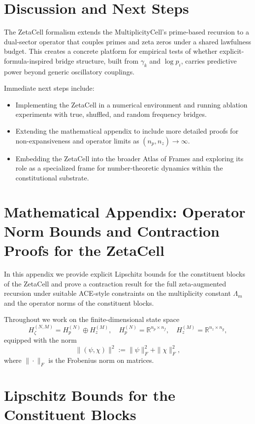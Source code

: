 \documentclass[11pt]{article}
\theoremstyle{definition}
\theoremstyle{plain}
\begin{document}
\section{Discussion and Next Steps}

The ZetaCell formalism extends the MultiplicityCell’s prime-based recursion to a dual-sector operator that couples primes and zeta zeros under a shared lawfulness budget.
This creates a concrete platform for empirical tests of whether explicit-formula-inspired bridge structure, built from $\gamma_k$ and $\log p_i$, carries predictive power beyond generic oscillatory couplings.

Immediate next steps include:

\begin{itemize}[leftmargin=*]
  \item Implementing the ZetaCell in a numerical environment and running ablation experiments with true, shuffled, and random frequency bridges.
  \item Extending the mathematical appendix to include more detailed proofs for non-expansiveness and operator limits as $(n_p,n_z)\to\infty$.
  \item Embedding the ZetaCell into the broader Atlas of Frames and exploring its role as a specialized frame for number-theoretic dynamics within the constitutional substrate.
\end{itemize}

\appendix
\section*{Mathematical Appendix: Operator Norm Bounds and Contraction Proofs for the ZetaCell}

In this appendix we provide explicit Lipschitz bounds for the constituent blocks of the ZetaCell and prove a contraction result for the full zeta-augmented recursion under suitable ACE-style constraints on the multiplicity constant $\Lambda_m$ and the operator norms of the constituent blocks.

Throughout we work on the finite-dimensional state space
\[
  H_\zeta^{(N,M)} = H_p^{(N)} \oplus H_z^{(M)},
  \quad
  H_p^{(N)} = \mathbb{R}^{n_p \times n_f},
  \quad
  H_z^{(M)} = \mathbb{R}^{n_z \times n_g},
\]
equipped with the norm
\[
  \|(\psi,\chi)\|^2
  := \|\psi\|_F^2 + \|\chi\|_F^2,
\]
where $\|\cdot\|_F$ is the Frobenius norm on matrices.

\section{Lipschitz Bounds for the Constituent Blocks}
\end{document}
